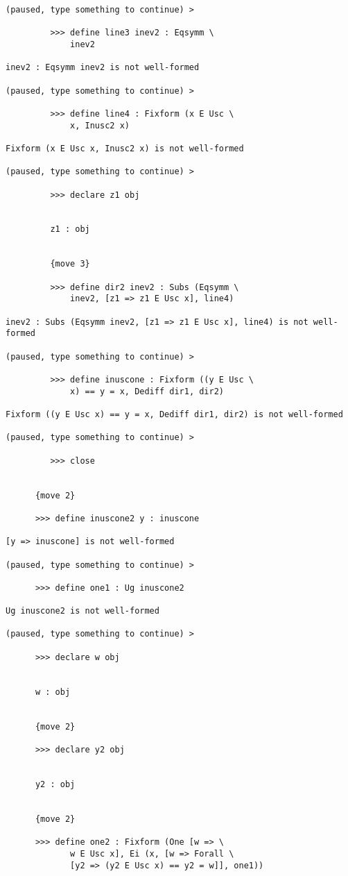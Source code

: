 \documentclass[12pt]{article}
\begin{document}
\begin{verbatim}
(paused, type something to continue) >

         >>> define line3 inev2 : Eqsymm \
             inev2

inev2 : Eqsymm inev2 is not well-formed

(paused, type something to continue) >

         >>> define line4 : Fixform (x E Usc \
             x, Inusc2 x)

Fixform (x E Usc x, Inusc2 x) is not well-formed

(paused, type something to continue) >

         >>> declare z1 obj


         z1 : obj


         {move 3}

         >>> define dir2 inev2 : Subs (Eqsymm \
             inev2, [z1 => z1 E Usc x], line4)

inev2 : Subs (Eqsymm inev2, [z1 => z1 E Usc x], line4) is not well-formed

(paused, type something to continue) >

         >>> define inuscone : Fixform ((y E Usc \
             x) == y = x, Dediff dir1, dir2)

Fixform ((y E Usc x) == y = x, Dediff dir1, dir2) is not well-formed

(paused, type something to continue) >

         >>> close


      {move 2}

      >>> define inuscone2 y : inuscone

[y => inuscone] is not well-formed

(paused, type something to continue) >

      >>> define one1 : Ug inuscone2

Ug inuscone2 is not well-formed

(paused, type something to continue) >

      >>> declare w obj


      w : obj


      {move 2}

      >>> declare y2 obj


      y2 : obj


      {move 2}

      >>> define one2 : Fixform (One [w => \
             w E Usc x], Ei (x, [w => Forall \
             [y2 => (y2 E Usc x) == y2 = w]], one1))


\end{verbatim}
\end{document}
